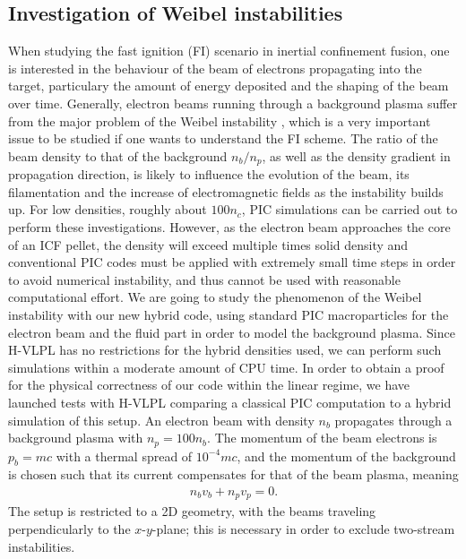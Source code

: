 \documentclass[conference]{IEEEtran}
\renewcommand{\~}{\widetilde }
\begin{document}
\subsection{Investigation of Weibel instabilities}
When studying the fast ignition (FI) scenario \cite{FI} in inertial confinement fusion, one is interested in the behaviour of the beam of electrons propagating into the target,
particulary the amount of energy deposited and the shaping of the beam over time. Generally, electron beams running through a background plasma suffer from the major problem of 
the Weibel instability \cite{Wei}, which is a very important issue to be studied if one wants to understand the FI scheme.
The ratio of the beam density to that of the background $n_b/n_p$, as well as the density gradient in propagation direction, is likely to influence the evolution of the beam, its filamentation and the  increase of electromagnetic fields as the instability builds up. \newline
For low densities, roughly about $100 n_c$, PIC simulations can be carried out to perform
these investigations. However, as the electron beam approaches the core of an ICF pellet,
the density will exceed multiple times solid density and conventional PIC codes must be
applied with extremely small time steps in order to avoid numerical instability, and thus
cannot be used with reasonable
computational effort. \newline
We are going to study the phenomenon of the Weibel instability with our new hybrid code, using standard PIC macroparticles for the electron beam and the fluid part in order to model the background plasma. Since H-VLPL has no restrictions for the hybrid densities used, we can perform such simulations within a moderate amount of CPU time. \newline
In order to obtain a proof for the physical correctness of our code within the linear regime, we have launched tests with H-VLPL comparing a classical PIC computation to a hybrid simulation of
this setup. An electron beam with density $n_b$ propagates through a background plasma with $n_p = 100 n_b$. The momentum of the beam electrons is $p_b = mc$ with a thermal spread of $10^{-4} mc$, and the momentum of the background is chosen such that its current compensates for that of the beam plasma, meaning
\begin{align*}
n_b v_b + n_p v_p = 0.
\end{align*}
The setup is restricted to a 2D geometry, with the beams traveling perpendicularly to the $x$-$y$-plane; this is necessary in order to exclude two-stream instabilities.
\end{document}
